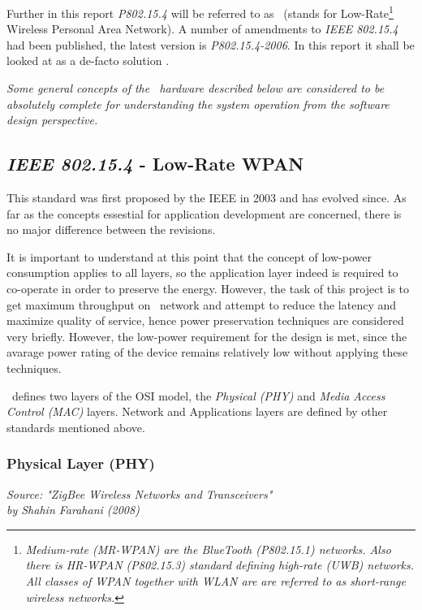  Further in this report \emph{P802.15.4} will be referred to as \WPAN\ 
 (stands for Low-Rate\footnote{\emph{Medium-rate (MR-WPAN) are the BlueTooth
 (P802.15.1) networks. Also there is HR-WPAN (P802.15.3) standard defining
 high-rate (UWB) networks. All classes of WPAN together with WLAN are
 are referred to as short-range wireless networks.}} Wireless Personal
 Area Network). A number of amendments to \emph{IEEE 802.15.4} had been
 published, the latest version is \emph{P802.15.4-2006}. In this report
 it shall be looked at as a de-facto solution \cite{links:wiki:p:wpan,
 links:wiki:p:lrwpan, links:ieee:802:15}.

 \emph{Some general concepts of the \WPAN\ hardware described below
 are considered to be absolutely complete for understanding the
 system operation from the software design perspective.}

\subsection{\emph{IEEE 802.15.4} - Low-Rate WPAN}

  This standard was first proposed by the IEEE in 2003 and has
 evolved since. As far as the concepts essestial for application
 development are concerned, there is no major difference between
 the revisions.

 It is important to understand at this point that the concept of
 low-power consumption applies to all layers, so the application
 layer indeed is required to co-operate in order to preserve the
 energy. However, the task of this project is to get maximum
 throughput on \WPAN\ network and attempt to reduce the latency
 and maximize quality of service, hence power preservation
 techniques are considered very briefly. However, the low-power
 requirement for the design is met, since the avarage power rating
 of the device remains relatively low without applying these
 techniques.
 

 \WPAN\ defines two layers of the OSI model, the \emph{Physical (PHY)}
 and \emph{Media Access Control (MAC)} layers. Network and Applications
 layers are defined by other standards mentioned above.


\subsubsection{Physical Layer (PHY)}

\begin{flushright} \small{
\emph{Source: "ZigBee Wireless Networks and Transceivers" \\
	by Shahin Farahani (2008) \cite{b:zigbee}}}
	\end{flushright}



